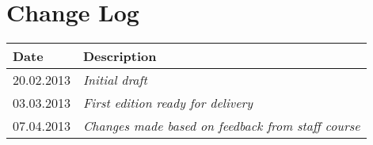 \section{Change Log}
\label{sec:changelog}
\begin{tabular}{|l|l|}
\hline
Date & Description \\ \hline
20.02.2013 & \emph{Initial draft\/} \\ \hline
03.03.2013 & \emph{First edition ready for delivery\/} \\ \hline
07.04.2013 & \emph{Changes made based on feedback from staff course\/} \\ \hline
\end{tabular}
